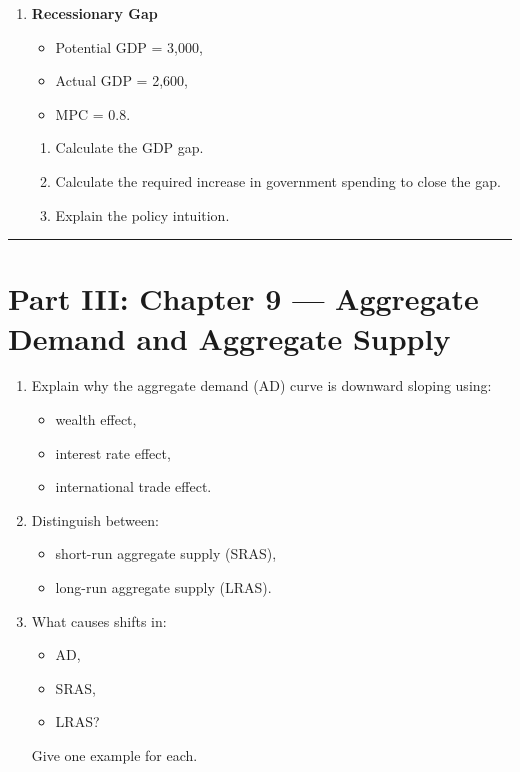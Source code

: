 \documentclass[12pt]{article}
\begin{document}
\begin{enumerate}[label=\textbf{\arabic*.}, start=11]
\newpage

\item \textbf{Recessionary Gap}

\begin{itemize}
    \item Potential GDP = 3,000,
    \item Actual GDP = 2,600,
    \item MPC = 0.8.
\end{itemize}

\begin{enumerate}
    \item[(a)] Calculate the GDP gap.
    \item[(b)] Calculate the required increase in government spending to close the gap.
    \item[(c)] Explain the policy intuition.
\end{enumerate}

\end{enumerate}

\hrule
\vspace{1em}

\section*{Part III: Chapter 9 — Aggregate Demand and Aggregate Supply}



\begin{enumerate}[label=\textbf{\arabic*.}, start=12]

\item Explain why the aggregate demand (AD) curve is downward sloping using:
\begin{itemize}
    \item wealth effect,
    \item interest rate effect,
    \item international trade effect.
\end{itemize}

\item Distinguish between:
\begin{itemize}
    \item short-run aggregate supply (SRAS),
    \item long-run aggregate supply (LRAS).
\end{itemize}

\item What causes shifts in:
\begin{itemize}
    \item AD,
    \item SRAS,
    \item LRAS?
\end{itemize}
Give one example for each.

\end{enumerate}
\end{document}
